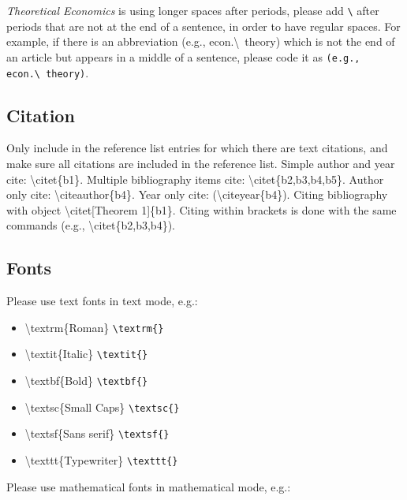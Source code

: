 \documentclass[qe,nameyear,draft]{econsocart}
\theoremstyle{plain}
\theoremstyle{remark}
\begin{document}
\textit{Theoretical Economics} is using longer spaces after periods, please add \texttt{{\textbackslash}} after periods that are not at the end of a sentence, in order to have regular spaces. For example, if there is an abbreviation (e.g., econ.{\textbackslash}~theory) which is not the end of an article but appears in a middle of a sentence, please code it as \texttt{(e.g., econ.{\textbackslash}~theory)}.

\subsection{Citation}

Only include in the reference list entries for which there are text citations,
and make sure all citations are included in the reference list.
Simple author and year cite: {\textbackslash}citet\{b1\}.
Multiple bibliography items cite: {\textbackslash}citet\{b2,b3,b4,b5\}.
Author only cite: {\textbackslash}citeauthor\{b4\}.
Year only cite: ({\textbackslash}citeyear\{b4\}). Citing bibliography with object {\textbackslash}citet[Theorem 1]\{b1\}. Citing within brackets is done with the same commands (e.g., {\textbackslash}citet\{b2,b3,b4\}).

\subsection{Fonts}

Please use text fonts in text mode, e.g.:

\begin{itemize}
\item {\textbackslash}textrm\{Roman\} \texttt{{\textbackslash}textrm\{\}}
\item {\textbackslash}textit\{Italic\} \texttt{{\textbackslash}textit\{\}}
\item {\textbackslash}textbf\{Bold\} \texttt{{\textbackslash}textbf\{\}}
\item {\textbackslash}textsc\{Small Caps\} \texttt{{\textbackslash}textsc\{\}}
\item {\textbackslash}textsf\{Sans serif\} \texttt{{\textbackslash}textsf\{\}}
\item {\textbackslash}texttt\{Typewriter\} \texttt{{\textbackslash}texttt\{\}}
\end{itemize}

Please use mathematical fonts in mathematical mode, e.g.:
\end{document}
